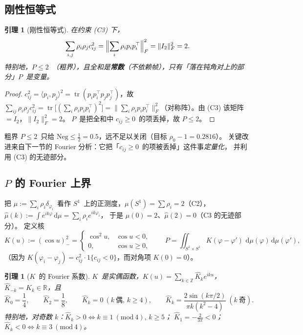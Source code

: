 \documentclass[UTF8,11pt]{ctexart}
\newtheorem{lemma}[theorem]{引理}
\theoremstyle{definition}
\newcommand{\tr}{\operatorname{tr}}
\newcommand{\dd}{\,\mathrm{d}}
\newcommand{\R}{\mathbb{R}}
\newcommand{\Z}{\mathbb{Z}}
\begin{document}
\subsection{刚性恒等式}\label{sec:r27:rigid}

\begin{lemma}[刚性恒等式]\label{lem:r27rigid}
在约束 (C3) 下，
\begin{equation}\label{eq:r27rigid}
\sum_{i,j}\rho_i\rho_jc_{ij}^2=\Bigl\|\sum_i\rho_ip_ip_i^\top\Bigr\|_F^2=\|I_2\|_F^2=2 .
\end{equation}
特别地，$P\le2$~（粗界），且全和是\textbf{常数}（不依赖帧），只有「落在钝角对上的部分」$P$~是变量。
\end{lemma}

\begin{proof}
$c_{ij}^2=\langle p_i,p_j\rangle^2=\tr(p_ip_i^\top p_jp_j^\top)$，故
$\sum_{ij}\rho_i\rho_jc_{ij}^2=\tr\bigl[(\sum_i\rho_ip_ip_i^\top)^2\bigr]
=\|\sum_i\rho_ip_ip_i^\top\|_F^2$（对称阵）。由 (C3) 该矩阵 $=I_2$，$\|I_2\|_F^2=2$。
$P$~是把全和中 $c_{ij}\ge0$~的项丢掉，故 $P\le2$。
\end{proof}

粗界 $P\le2$~只给 $\mathrm{Neg}\le\frac12=0.5$，远不足以关闭（目标 $\rho_0-1=0.2816$）。
关键改进来自下一节的 Fourier 分析：它把「$c_{ij}\ge0$~的项被丢掉」这件事\emph{定量化}，
并利用 (C3) 的无迹部分。

\subsection{$P$ 的 Fourier 上界}\label{sec:r27:fourier}

把 $\mu:=\sum_i\rho_i\delta_{\varphi_i}$~看作 $S^1$~上的正测度，$\mu(S^1)=\sum\rho_i=2$（C2），
$\widehat\mu(k):=\int e^{ik\varphi}\dd\mu=\sum_i\rho_ie^{ik\varphi_i}$，
于是 $\widehat\mu(0)=2$、$\widehat\mu(2)=0$（C3 的无迹部分）。
定义核
\begin{equation}\label{eq:r27K}
K(u):=(\cos u)_-^2=\begin{cases}\cos^2u,&\cos u<0,\\[2pt]0,&\cos u\ge0,\end{cases}
\qquad
P=\iint_{S^1\times S^1}K(\varphi-\varphi')\,\dd\mu(\varphi)\dd\mu(\varphi'),
\end{equation}
（因为 $K(\varphi_i-\varphi_j)=c_{ij}^2\cdot1\{c_{ij}<0\}$，而对角项 $K(0)=0$）。

\begin{lemma}[$K$~的 Fourier 系数]\label{lem:r27Khat}
$K$~是实偶函数，$K(u)=\sum_{k\in\Z}\widehat K_ke^{iku}$，$\widehat K_{-k}=\widehat K_k\in\R$，且
\begin{equation}\label{eq:r27Khat}
\widehat K_0=\frac14,\qquad
\widehat K_2=\frac18,\qquad
\widehat K_k=0\ (k\ \text{偶},\,k\ge4),\qquad
\widehat K_k=\frac{2\sin(k\pi/2)}{\pi k(k^2-4)}\ (k\ \text{奇}).
\end{equation}
特别地，对奇数 $k$：$\widehat K_k>0\iff k\equiv1\ (\mathrm{mod}\ 4),\,k\ge5$；
$\widehat K_1=-\frac2{3\pi}<0$；$\widehat K_k<0\iff k\equiv3\ (\mathrm{mod}\ 4)$。
\end{lemma}
\end{document}
